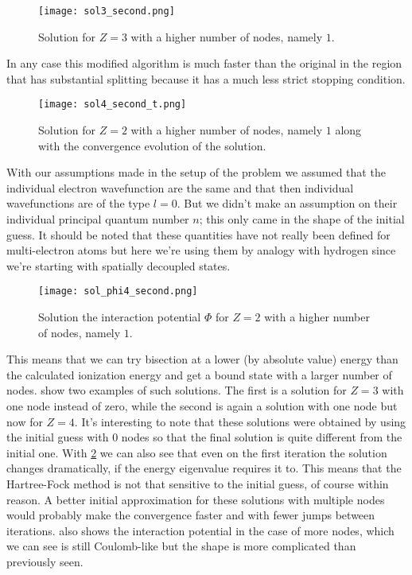 \documentclass[10pt,a4paper,twocolumn]{article}
\begin{document}
\begin{figure}
    \centering
    \texttt{[image: sol3\_second.png]}
    \caption{Solution for $Z = 3$ with a higher number of nodes, namely $1$.}
    \label{fig:sol3_second}
\end{figure}

In any case this modified algorithm is much faster than the original in the region that has substantial splitting because it has a much less strict stopping condition.

\begin{figure}[!h]
    \centering
    \texttt{[image: sol4\_second\_t.png]}
    \caption{Solution for $Z = 2$ with a higher number of nodes, namely $1$ along with the convergence evolution of the solution.}
    \label{fig:sol4_second}
\end{figure}

With our assumptions made in the setup of the problem we assumed that the individual electron wavefunction are the same and that then individual wavefunctions are of the type $l=0$. But we didn't make an assumption on their individual principal quantum number $n$; this only came in the shape of the initial guess. It should be noted that these quantities have not really been defined for multi-electron atoms but here we're using them by analogy with hydrogen since we're starting with spatially decoupled states. 

\begin{figure}[!ht]
    \centering
    \texttt{[image: sol\_phi4\_second.png]}
    \caption{Solution the interaction potential $\Phi$ for $Z = 2$ with a higher number of nodes, namely $1$.}
    \label{fig:phisol4_second}
\end{figure}

This means that we can try bisection at a lower (by absolute value) energy than the calculated ionization energy and get a bound state with a larger number of nodes.  show two examples of such solutions. The first is a solution for $Z=3$ with one node instead of zero, while the second is again a solution with one node but now for $Z=4$. It's interesting to note that these solutions were obtained by using the initial guess with $0$ nodes so that the final solution is quite different from the initial one. With \cref{fig:sol4_second} we can also see that even on the first iteration the solution changes dramatically, if the energy eigenvalue requires it to. This means that the Hartree-Fock method is not that sensitive to the initial guess, of course within reason. A better initial approximation for these solutions with multiple nodes would probably make the convergence faster and with fewer jumps between iterations.  also shows the interaction potential in the case of more nodes, which we can see is still Coulomb-like but the shape is more complicated than previously seen.



\printbibliography
\end{document}
